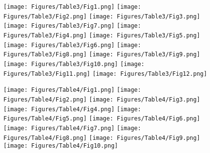 \documentclass[a4paper, 11pt, oneside]{article}
\begin{document}
\clearpage
{}
\cfoot{\frakfamily{\thepage}}
\begin{figure}[p]
\texttt{[image: Figures/Table3/Fig1.png]}\tiny{}
\texttt{[image: Figures/Table3/Fig2.png]}\tiny{}
\texttt{[image: Figures/Table3/Fig3.png]}\tiny{}
\texttt{[image: Figures/Table3/Fig7.png]}\tiny{}
\texttt{[image: Figures/Table3/Fig4.png]}\tiny{}
\texttt{[image: Figures/Table3/Fig5.png]}\tiny{}
\texttt{[image: Figures/Table3/Fig6.png]}\tiny{}
\texttt{[image: Figures/Table3/Fig8.png]}\tiny{}
\texttt{[image: Figures/Table3/Fig9.png]}\tiny{}
\texttt{[image: Figures/Table3/Fig10.png]}\tiny{}
\texttt{[image: Figures/Table3/Fig11.png]}\tiny{}
\texttt{[image: Figures/Table3/Fig12.png]}\tiny{}
\end{figure}
\clearpage
{}
\cfoot{\frakfamily{\thepage}}
\begin{figure}[p]
\texttt{[image: Figures/Table4/Fig1.png]}\tiny{}
\texttt{[image: Figures/Table4/Fig2.png]}\tiny{}
\texttt{[image: Figures/Table4/Fig3.png]}\tiny{}
\texttt{[image: Figures/Table4/Fig4.png]}\tiny{}
\texttt{[image: Figures/Table4/Fig5.png]}\tiny{}
\texttt{[image: Figures/Table4/Fig6.png]}\tiny{}
\texttt{[image: Figures/Table4/Fig7.png]}\tiny{}
\texttt{[image: Figures/Table4/Fig8.png]}\tiny{}
\texttt{[image: Figures/Table4/Fig9.png]}\tiny{}
\texttt{[image: Figures/Table4/Fig10.png]}\tiny{}
\end{figure}
\clearpage
\end{document}
